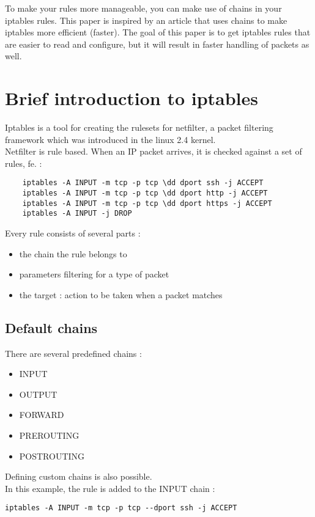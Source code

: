 \documentclass[a4paper,12pt]{article}
\begin{document}
To make your rules more manageable, you can make use of chains in your iptables rules. This paper is inspired by an article that uses chains to make iptables more efficient (faster). The goal of this paper is to get iptables rules that are easier to read and configure, but it will result in faster handling of packets as well.\\

\section{Brief introduction to iptables}
  Iptables is a tool for creating the rulesets for netfilter, a packet filtering framework which was introduced in the linux 2.4 kernel.\\

  Netfilter is rule based. When an IP packet arrives, it is checked against a set of rules, fe. :
  \begin{verbatim}
    iptables -A INPUT -m tcp -p tcp \dd dport ssh -j ACCEPT
    iptables -A INPUT -m tcp -p tcp \dd dport http -j ACCEPT
    iptables -A INPUT -m tcp -p tcp \dd dport https -j ACCEPT
    iptables -A INPUT -j DROP
  \end{verbatim}

  Every rule consists of several parts :
  \begin{itemize}
    \item the chain the rule belongs to
    \item parameters filtering for a type of packet
    \item the target : action to be taken when a packet matches
  \end{itemize}

  \subsection{Default chains}
    There are several predefined chains :
    \begin{itemize}
      \item INPUT
      \item OUTPUT
      \item FORWARD
      \item PREROUTING
      \item POSTROUTING
    \end{itemize}
    Defining custom chains is also possible.\\
    
    In this example, the rule is added to the INPUT chain :
    \begin{verbatim}
iptables -A INPUT -m tcp -p tcp --dport ssh -j ACCEPT
    \end{verbatim}
\end{document}

